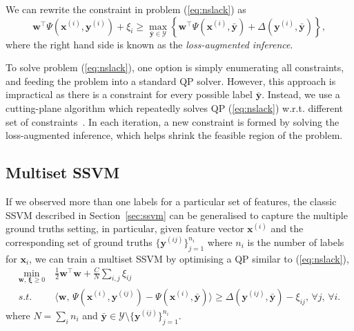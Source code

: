 We can rewrite the constraint in problem (\ref{eq:nslack}) as
\begin{equation}
\label{eq:ssvminf}
\mathbf{w}^\top \Psi(\mathbf{x}^{(i)}, \mathbf{y}^{(i)}) + \xi_i \ge
          \max_{\bar{\mathbf{y}} \in \mathcal{Y}}
          \left\{\mathbf{w}^\top \Psi(\mathbf{x}^{(i)}, \bar{\mathbf{y}}) + \Delta(\mathbf{y}^{(i)}, \bar{\mathbf{y}}) \right\},
\end{equation}
where the right hand side is known as the \emph{loss-augmented inference}.

To solve problem (\ref{eq:nslack}), one option is simply enumerating all constraints, and feeding the problem into a standard QP solver.
However, this approach is impractical as there is a constraint for every possible label $\bar{\mathbf{y}}$.
Instead, we use a cutting-plane algorithm which repeatedly solves QP (\ref{eq:nslack}) 
w.r.t. different set of constraints~\cite{joachims2009predicting}.
In each iteration, a new constraint is formed by solving the loss-augmented inference, 
which helps shrink the feasible region of the problem.


\subsection{Multiset SSVM}
\label{sec:ssvm-ms}

If we observed more than one labels for a particular set of features, 
the classic SSVM described in Section~\ref{sec:ssvm} can be generalised to capture the multiple ground truths setting,
in particular, given feature vector $\mathbf{x}^{(i)}$ and the corresponding set of ground truths $\{\mathbf{y}^{(ij)}\}_{j=1}^{n_i}$ 
where $n_i$ is the number of labels for $\mathbf{x}_i$,
we can train a multiset SSVM by optimising a QP similar to (\ref{eq:nslack}),
\begin{equation}
\label{eq:nslack_ml}
\begin{aligned}
\min_{\mathbf{w}, \, \bm{\xi} \ge 0} ~& \frac{1}{2} \mathbf{w}^\top \mathbf{w} + \frac{C}{N} \sum_{i,j} \xi_{ij} \\
s.t.~ ~& \langle \mathbf{w}, \, \Psi(\mathbf{x}^{(i)}, \mathbf{y}^{(ij)}) - \Psi(\mathbf{x}^{(i)}, \bar{\mathbf{y}}) \rangle \ge 
         \Delta(\mathbf{y}^{(ij)}, \bar{\mathbf{y}}) - \xi_{ij}, \, \forall j, \, \forall i.
\end{aligned}
\end{equation}
where $N = \sum_i n_i$ and $\bar{\mathbf{y}} \in \mathcal{Y} \setminus \{\mathbf{y}^{(ij)}\}_{j=1}^{n_i}$.



